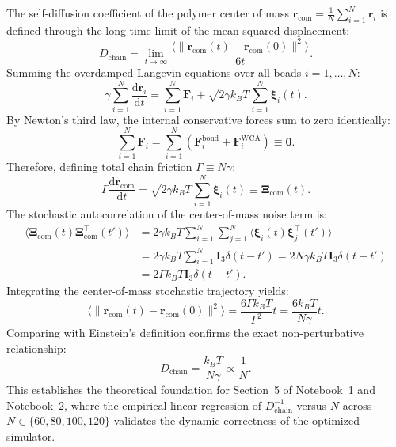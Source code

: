 \documentclass[12pt,a4paper]{article}
\begin{document}
The self-diffusion coefficient of the polymer center of mass $\mathbf{r}_\text{com} = \frac{1}{N} \sum_{i=1}^N \mathbf{r}_i$ is defined through the long-time limit of the mean squared displacement:
\begin{equation}
  D_\text{chain} = \lim_{t \to \infty} \frac{\langle \|\mathbf{r}_\text{com}(t) - \mathbf{r}_\text{com}(0)\|^2 \rangle}{6 t}.
\end{equation}
Summing the overdamped Langevin equations over all beads $i=1, \ldots, N$:
\begin{equation}
  \gamma \sum_{i=1}^N \frac{\mathrm{d}\mathbf{r}_i}{\mathrm{d}t} = \sum_{i=1}^N \mathbf{F}_i + \sqrt{2 \gamma k_B T} \sum_{i=1}^N \boldsymbol{\xi}_i(t).
\end{equation}
By Newton's third law, the internal conservative forces sum to zero identically:
\begin{equation}
  \sum_{i=1}^N \mathbf{F}_i = \sum_{i=1}^N \left( \mathbf{F}_i^\text{bond} + \mathbf{F}_i^\text{WCA} \right) \equiv \mathbf{0}.
\end{equation}
Therefore, defining total chain friction $\Gamma \equiv N \gamma$:
\begin{equation}
  \Gamma \frac{\mathrm{d}\mathbf{r}_\text{com}}{\mathrm{d}t} = \sqrt{2 \gamma k_B T} \sum_{i=1}^N \boldsymbol{\xi}_i(t) \equiv \boldsymbol{\Xi}_\text{com}(t).
\end{equation}
The stochastic autocorrelation of the center-of-mass noise term is:
\begin{align}
  \langle \boldsymbol{\Xi}_\text{com}(t) \boldsymbol{\Xi}_\text{com}^\top(t') \rangle
  &= 2 \gamma k_B T \sum_{i=1}^N \sum_{j=1}^N \langle \boldsymbol{\xi}_i(t) \boldsymbol{\xi}_j^\top(t') \rangle \nonumber\\
  &= 2 \gamma k_B T \sum_{i=1}^N \mathbf{I}_3 \delta(t - t') = 2 N \gamma k_B T \mathbf{I}_3 \delta(t - t') \nonumber\\
  &= 2 \Gamma k_B T \mathbf{I}_3 \delta(t - t').
\end{align}
Integrating the center-of-mass stochastic trajectory yields:
\begin{equation}
  \langle \|\mathbf{r}_\text{com}(t) - \mathbf{r}_\text{com}(0)\|^2 \rangle = \frac{6 \Gamma k_B T}{\Gamma^2} t = \frac{6 k_B T}{N \gamma} t.
\end{equation}
Comparing with Einstein's definition confirms the exact non-perturbative relationship:
\begin{equation}
  D_\text{chain} = \frac{k_B T}{N \gamma} \propto \frac{1}{N}.
\end{equation}
This establishes the theoretical foundation for Section~5 of Notebook~1 and Notebook~2, where the empirical linear regression of $D_\text{chain}^{-1}$ versus $N$ across $N \in \{60, 80, 100, 120\}$ validates the dynamic correctness of the optimized simulator.
\end{document}
